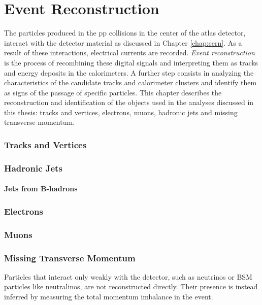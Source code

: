 \chapter{Event Reconstruction}
\label{sec:event:reco}

The particles produced in the \acrshort{pp} collisions in the center of the \acrshort{atlas} detector, interact with the detector material as discussed in Chapter \ref{chap:cern}. As a result of these interactions, electrical currents are recorded. \textit{Event reconstruction} is the process of recombining these digital signals and interpreting them as tracks and energy deposits in the calorimeters. A further step consists in analyzing the characteristics of the candidate tracks and calorimeter clusters and identify them as signs of the passage of specific particles.
This chapter describes the reconstruction and identification of the objects used in the analyses discussed in this thesis: tracks and vertices, electrons, muons, hadronic jets and missing transverse momentum. 



\subsection{Tracks and Vertices}
\label{sec:reco:tracks}

\subsection{Hadronic Jets}

\subsubsection{Jets from B-hadrons}


\subsection{Electrons}

\subsection{Muons}

\subsection{Missing Transverse Momentum}

Particles that interact only weakly with the detector, such as neutrinos or BSM particles like neutralinos, are not reconstructed directly. 
Their presence is instead inferred by measuring the total momentum imbalance in the event. 